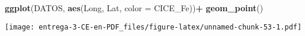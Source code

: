 \documentclass[
]{article}
\newenvironment{Shaded}{\begin{snugshade}}{\end{snugshade}}
\newcommand{\DataTypeTok}[1]{\textcolor[rgb]{0.13,0.29,0.53}{#1}}
\newcommand{\DecValTok}[1]{\textcolor[rgb]{0.00,0.00,0.81}{#1}}
\newcommand{\KeywordTok}[1]{\textcolor[rgb]{0.13,0.29,0.53}{\textbf{#1}}}
\newcommand{\NormalTok}[1]{#1}
\newcommand{\OperatorTok}[1]{\textcolor[rgb]{0.81,0.36,0.00}{\textbf{#1}}}
\newcommand{\StringTok}[1]{\textcolor[rgb]{0.31,0.60,0.02}{#1}}
\begin{document}
\begin{Shaded}
\begin{Highlighting}[]
\KeywordTok{ggplot}\NormalTok{(DATOS, }\KeywordTok{aes}\NormalTok{(Long, Lat, }\DataTypeTok{color =}\NormalTok{ CICE_Fe))}\OperatorTok{+}
\StringTok{  }\KeywordTok{geom_point}\NormalTok{()}
\end{Highlighting}
\end{Shaded}

\texttt{[image: entrega-3-CE-en-PDF\_files/figure-latex/unnamed-chunk-53-1.pdf]}

\begin{Shaded}
\end{Shaded}
\end{document}
